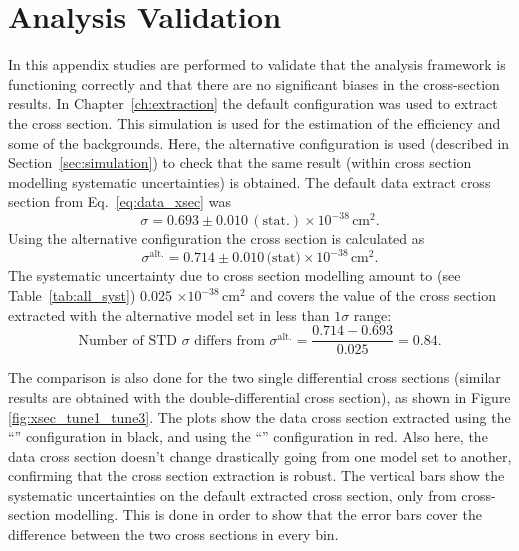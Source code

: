\chapter{Analysis Validation}
\label{ch:appendix_validation}

In this appendix studies are performed to validate that the analysis framework is functioning correctly and that there are no significant biases in the cross-section results.
In Chapter~\ref{ch:extraction} the default \g configuration was used to extract the cross section. This simulation is used for the estimation of the efficiency and some of the backgrounds. Here, the alternative \g configuration is used (described in Section~\ref{sec:simulation}) to check that the same result (within cross section modelling systematic uncertainties) is obtained.
The default data extract cross section from Eq.~\ref{eq:data_xsec} was
\begin{equation}
\sigma = 0.693 \pm 0.010 \, (\text{stat.}) \times 10^{-38} \, \text{cm}^2.
\end{equation}
Using the alternative \g configuration the cross section is calculated as
\begin{equation}
\sigma^\text{alt.} = 0.714 \pm 0.010 \, \text{(stat)} \times 10^{-38} \,\text{cm}^2.
\end{equation}
The systematic uncertainty due to cross section modelling amount to (see Table~\ref{tab:all_syst}) 0.025 $\times 10^{-38} \,\text{cm}^2$ and covers the value of the cross section extracted with the alternative model set in less than $1\sigma$ range:
\begin{equation}
\text{Number of STD } \sigma \text{ differs from } \sigma^\text{alt.} = \frac{0.714-0.693}{0.025} = 0.84.
\end{equation} 

The comparison is also done for the two single differential cross sections (similar results are obtained with the double-differential cross section), as shown in Figure \ref{fig:xsec_tune1_tune3}. The plots show the data cross section extracted using the ``\tuneone'' configuration in black, and using the ``\tunethree'' configuration in red. Also here, the data cross section doesn't change drastically going from one model set to another, confirming that the cross section extraction is robust. The vertical bars show the systematic uncertainties on the default extracted cross section, only from cross-section modelling. This is done in order to show that the error bars cover the difference between the two cross sections in every bin.

